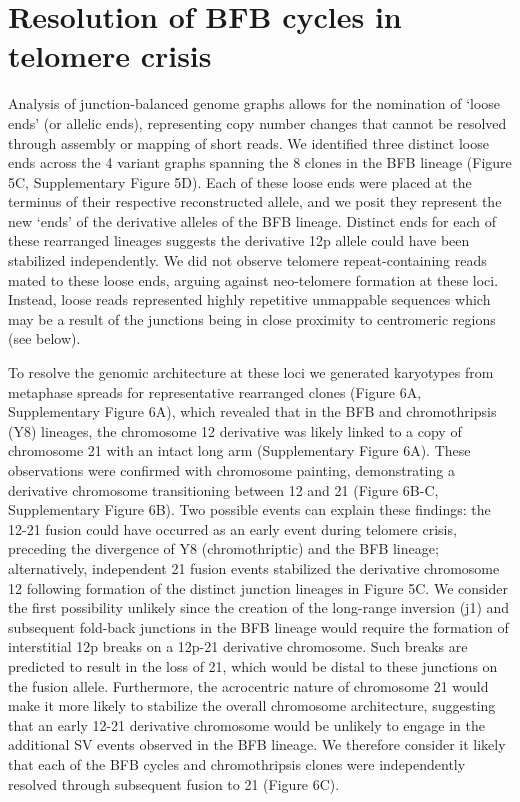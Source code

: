 \documentclass[phd,tocprelim]{cornell}
\begin{document}
\section{Resolution of BFB cycles in telomere crisis}
Analysis of junction-balanced genome graphs allows for the nomination of ‘loose ends’ (or allelic ends), representing copy number changes that cannot be resolved through assembly or mapping of short reads. We identified three distinct loose ends across the 4 variant graphs spanning the 8 clones in the BFB lineage (Figure 5C, Supplementary Figure 5D). Each of these loose ends were placed at the terminus of their respective reconstructed allele, and we posit they represent the new ‘ends’ of the derivative alleles of the BFB lineage. Distinct ends for each of these rearranged lineages suggests the derivative 12p allele could have been stabilized independently. We did not observe telomere repeat-containing reads mated to these loose ends, arguing against neo-telomere formation at these loci. Instead, loose reads represented highly repetitive unmappable sequences which may be a result of the junctions being in close proximity to centromeric regions (see below). 

To resolve the genomic architecture at these loci we generated karyotypes from metaphase spreads for representative rearranged clones (Figure 6A, Supplementary Figure 6A), which revealed that in the BFB and chromothripsis (Y8) lineages, the chromosome 12 derivative was likely linked to a copy of chromosome 21 with an intact long arm (Supplementary Figure 6A). These observations were confirmed with chromosome painting, demonstrating a derivative chromosome transitioning between 12 and 21 (Figure 6B-C, Supplementary Figure 6B). Two possible events can explain these findings: the 12-21 fusion could have occurred as an early event during telomere crisis, preceding the divergence of Y8 (chromothriptic) and the BFB lineage; alternatively, independent 21 fusion events stabilized the derivative chromosome 12 following formation of the distinct junction lineages in Figure 5C. We consider the first possibility unlikely since the creation of the long-range inversion (j1) and subsequent fold-back junctions in the BFB lineage would require the formation of interstitial 12p breaks on a 12p-21 derivative chromosome. Such breaks are predicted to result in the loss of 21, which would be distal to these junctions on the fusion allele. Furthermore, the acrocentric nature of chromosome 21 would make it more likely to stabilize the overall chromosome architecture, suggesting that an early 12-21 derivative chromosome would be unlikely to engage in the additional SV events observed in the BFB lineage. We therefore consider it likely that each of the BFB cycles and chromothripsis clones were independently resolved through subsequent fusion to 21 (Figure 6C).
\end{document}
